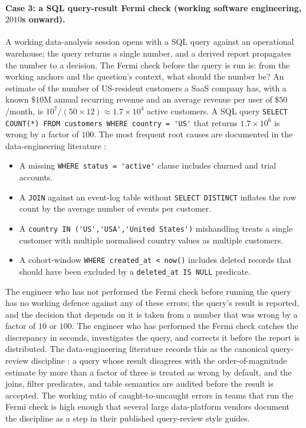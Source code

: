 \paragraph{Case 3: a SQL query-result Fermi check (working
software engineering, $2010$s onward).} A working data-analysis
session opens with a SQL query against an operational warehouse;
the query returns a single number, and a derived report
propagates the number to a decision. The Fermi check before the
query is run is: from the working anchors and the question's
context, what should the number be? An estimate of the number of
US-resident customers a SaaS company has, with a known $\$10$M
annual recurring revenue and an average revenue per user of
$\$50$/month, is $10^{7} / (50 \times 12) \approx 1.7 \times
10^{4}$ active customers. A SQL query
\verb|SELECT COUNT(*) FROM customers WHERE country = 'US'| that
returns $1.7 \times 10^{6}$ is wrong by a factor of $100$. The
most frequent root causes are documented in the data-engineering
literature \cite{text:ch09t3b-kimball-2013}:

\begin{itemize}\setlength\itemsep{2pt}
\item A missing \verb|WHERE status = 'active'| clause includes
churned and trial accounts.
\item A \verb|JOIN| against an event-log table without
\verb|SELECT DISTINCT| inflates the row count by the average
number of events per customer.
\item A \verb|country IN ('US','USA','United States')|
mishandling treats a single customer with multiple normalised
country values as multiple customers.
\item A cohort-window \verb|WHERE created_at < now()| includes
deleted records that should have been excluded by a
\verb|deleted_at IS NULL| predicate.
\end{itemize}

The engineer who has not performed the Fermi check before running
the query has no working defence against any of these errors;
the query's result is reported, and the decision that depends on
it is taken from a number that was wrong by a factor of $10$ or
$100$. The engineer who has performed the Fermi check catches the
discrepancy in seconds, investigates the query, and corrects it
before the report is distributed. The data-engineering literature
records this as the canonical query-review discipline
\cite{text:ch09t3b-kimball-2013, web:ch09t3b-wickham-tidy-2014}:
a query whose result disagrees with the order-of-magnitude
estimate by more than a factor of three is treated as wrong by
default, and the joins, filter predicates, and table semantics
are audited before the result is accepted. The working ratio of
caught-to-uncaught errors in teams that run the Fermi check is
high enough that several large data-platform vendors document
the discipline as a step in their published query-review style
guides.

